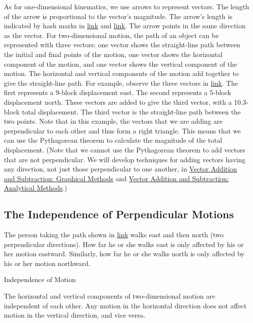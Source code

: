 \documentclass[
]{book}
\begin{document}
As for one-dimensional kinematics, we use arrows to represent vectors.
The length of the arrow is proportional to the vector's magnitude. The
arrow's length is indicated by hash marks in
\protect\hyperlink{import-auto-id1165296250183}{link} and
\protect\hyperlink{import-auto-id1165298535408}{link}. The arrow
points in the same direction as the vector. For two-dimensional motion,
the path of an object can be represented with three vectors: one vector
shows the straight-line path between the initial and final points of the
motion, one vector shows the horizontal component of the motion, and one
vector shows the vertical component of the motion. The horizontal and
vertical components of the motion add together to give the straight-line
path. For example, observe the three vectors in
\protect\hyperlink{import-auto-id1165298535408}{link}. The first
represents a 9-block displacement east. The second represents a 5-block
displacement north. These vectors are added to give the third vector,
with a 10.3-block total displacement. The third vector is the
straight-line path between the two points. Note that in this example,
the vectors that we are adding are perpendicular to each other and thus
form a right triangle. This means that we can use the Pythagorean
theorem to calculate the magnitude of the total displacement. (Note that
we cannot use the Pythagorean theorem to add vectors that are not
perpendicular. We will develop techniques for adding vectors having any
direction, not just those perpendicular to one another, in \href{/m54781}{Vector
Addition and Subtraction: Graphical Methods} and \href{/m54783}{Vector
Addition and Subtraction: Analytical Methods}.)

\hypertarget{fs-id1165298695671}{}
\hypertarget{the-independence-of-perpendicular-motions}{%
\subsection{The Independence of Perpendicular Motions}\label{the-independence-of-perpendicular-motions}}

The person taking the path shown in
\protect\hyperlink{import-auto-id1165298535408}{link} walks east
and then north (two perpendicular directions). How far he or she walks
east is only affected by his or her motion eastward. Similarly, how far
he or she walks north is only affected by his or her motion northward.

\hypertarget{fs-id1165298714031}{}
Independence of Motion

The horizontal and vertical components of two-dimensional motion are
independent of each other. Any motion in the horizontal direction does
not affect motion in the vertical direction, and vice versa.
\end{document}

